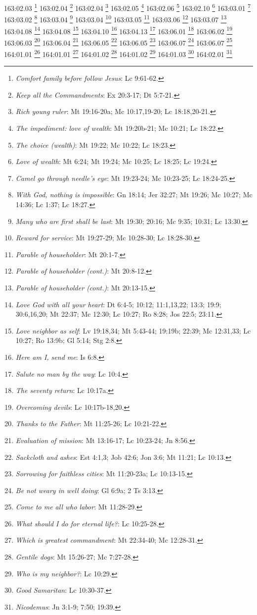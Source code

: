 163:02.03 \footnote{\textit{Comfort family before follow Jesus}: Lc 9:61-62.}
163:02.04 \footnote{\textit{Keep all the Commandments}: Ex 20:3-17; Dt 5:7-21.}
163:02.04 \footnote{\textit{Rich young ruler}: Mt 19:16-20a; Mc 10:17,19-20; Lc 18:18,20-21.}
163:02.05 \footnote{\textit{The impediment: love of wealth}: Mt 19:20b-21; Mc 10:21; Lc 18:22.}
163:02.06 \footnote{\textit{The choice (wealth)}: Mt 19:22; Mc 10:22; Lc 18:23.}
163:02.10 \footnote{\textit{Love of wealth}: Mt 6:24; Mt 19:24; Mc 10:25; Lc 18:25; Lc 19:24.}
163:03.01 \footnote{\textit{Camel go through needle's eye}: Mt 19:23-24; Mc 10:23-25; Lc 18:24-25.}
163:03.02 \footnote{\textit{With God, nothing is impossible}: Gn 18:14; Jer 32:27; Mt 19:26; Mc 10:27; Mc 14:36; Lc 1:37; Lc 18:27.}
163:03.04 \footnote{\textit{Many who are first shall be last}: Mt 19:30; 20:16; Mc 9:35; 10:31; Lc 13:30.}
163:03.04 \footnote{\textit{Reward for service}: Mt 19:27-29; Mc 10:28-30; Lc 18:28-30.}
163:03.05 \footnote{\textit{Parable of householder}: Mt 20:1-7.}
163:03.06 \footnote{\textit{Parable of householder (cont.)}: Mt 20:8-12.}
163:03.07 \footnote{\textit{Parable of householder (cont.)}: Mt 20:13-15.}
163:04.08 \footnote{\textit{Love God with all your heart}: Dt 6:4-5; 10:12; 11:1,13,22; 13:3; 19:9; 30:6,16,20; Mt 22:37; Mc 12:30; Lc 10:27; Ro 8:28; Jos 22:5; 23:11.}
163:04.08 \footnote{\textit{Love neighbor as self}: Lv 19:18,34; Mt 5:43-44; 19:19b; 22:39; Mc 12:31,33; Lc 10:27; Ro 13:9b; Gl 5:14; Stg 2:8.}
163:04.10 \footnote{\textit{Here am I, send me}: Is 6:8.}
163:04.13 \footnote{\textit{Salute no man by the way}: Lc 10:4.}
163:06.01 \footnote{\textit{The seventy return}: Lc 10:17a.}
163:06.02 \footnote{\textit{Overcoming devils}: Lc 10:17b-18,20.}
163:06.03 \footnote{\textit{Thanks to the Father}: Mt 11:25-26; Lc 10:21-22.}
163:06.04 \footnote{\textit{Evaluation of mission}: Mt 13:16-17; Lc 10:23-24; Jn 8:56.}
163:06.05 \footnote{\textit{Sackcloth and ashes}: Est 4:1,3; Job 42:6; Jon 3:6; Mt 11:21; Lc 10:13.}
163:06.05 \footnote{\textit{Sorrowing for faithless cities}: Mt 11:20-23a; Lc 10:13-15.}
163:06.07 \footnote{\textit{Be not weary in well doing}: Gl 6:9a; 2 Ts 3:13.}
163:06.07 \footnote{\textit{Come to me all who labor}: Mt 11:28-29.}
164:01.01 \footnote{\textit{What should I do for eternal life?}: Lc 10:25-28.}
164:01.01 \footnote{\textit{Which is greatest commandment}: Mt 22:34-40; Mc 12:28-31.}
164:01.02 \footnote{\textit{Gentile dogs}: Mt 15:26-27; Mc 7:27-28.}
164:01.02 \footnote{\textit{Who is my neighbor?}: Lc 10:29.}
164:01.03 \footnote{\textit{Good Samaritan}: Lc 10:30-37.}
164:02.01 \footnote{\textit{Nicodemus}: Jn 3:1-9; 7:50; 19:39.}
